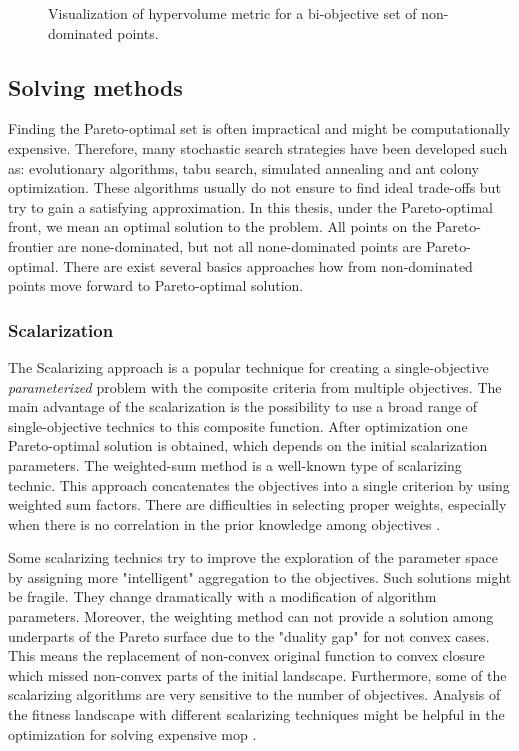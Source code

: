 \begin{figure}
                \caption[Visualization of hypervolume metric for a bi-objective set of non-dominated points]{Visualization of hypervolume metric for a bi-objective set of non-dominated points.}
                \label{fig:hypervolume}    
            \end{figure}
 
        \subsection{Solving methods}
            Finding the Pareto-optimal set is often impractical and might be computationally expensive. Therefore, many stochastic search strategies have been developed such as: evolutionary algorithms, tabu search, simulated annealing and ant colony optimization. These algorithms usually do not ensure to find ideal trade-offs but try to gain a satisfying approximation.
            In this thesis, under the Pareto-optimal front, we mean an optimal solution to the problem. All points on the Pareto-frontier are none-dominated, but not all none-dominated points are Pareto-optimal. There are exist several basics approaches how from non-dominated points move forward to Pareto-optimal solution.
        
            \subsubsection{Scalarization}
                The Scalarizing approach is a popular technique for creating a single-objective \textit{parameterized} problem with the composite criteria from multiple objectives. The main advantage of the scalarization is the possibility to use a broad range of single-objective technics to this composite function. After optimization one Pareto-optimal solution is obtained, which depends on the initial scalarization parameters. The weighted-sum method is a well-known type of scalarizing technic. This approach concatenates the objectives into a single criterion by using weighted sum factors. There are difficulties in selecting proper weights, especially when there is no correlation in the prior knowledge among objectives \cite{ChughScal2019, DerbelBLV14}. 

                Some scalarizing technics try to improve the exploration of the parameter space by assigning more "intelligent" aggregation to the objectives. Such solutions might be fragile. They change dramatically with a modification of algorithm parameters. Moreover, the weighting method can not provide a solution among underparts of the Pareto surface due to the "duality gap" for not convex cases. This means the replacement of non-convex original function to convex closure which missed non-convex parts of the initial landscape. Furthermore, some of the scalarizing algorithms are very sensitive to the number of objectives. Analysis of the fitness landscape with different scalarizing techniques might be helpful in the optimization for solving expensive \gls{mop} \cite{ChughScal2019}.

